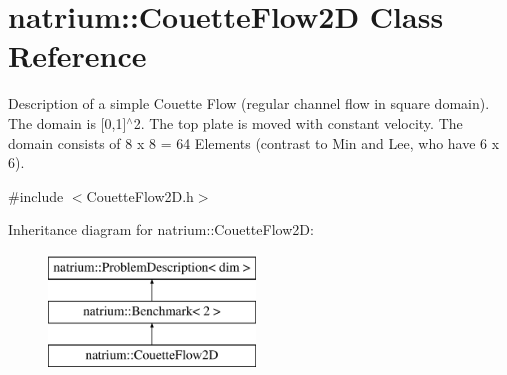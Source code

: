 \hypertarget{classnatrium_1_1CouetteFlow2D}{\section{natrium\-:\-:Couette\-Flow2\-D Class Reference}
\label{classnatrium_1_1CouetteFlow2D}
}


Description of a simple Couette Flow (regular channel flow in square domain). The domain is \mbox{[}0,1\mbox{]}$^\wedge$2. The top plate is moved with constant velocity. The domain consists of 8 x 8 = 64 Elements (contrast to Min and Lee, who have 6 x 6).  




{\ttfamily \#include $<$Couette\-Flow2\-D.\-h$>$}

Inheritance diagram for natrium\-:\-:Couette\-Flow2\-D\-:\begin{figure}[H]
\begin{center}
\leavevmode
\includegraphics[height=3.000000cm]{classnatrium_1_1CouetteFlow2D}
\end{center}
\end{figure}
